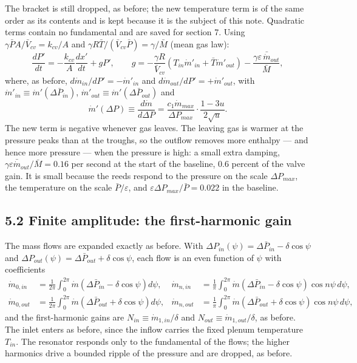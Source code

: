 \documentclass[11pt]{article}
\begin{document}
The bracket is still dropped, as before; the new temperature term is of the same order as its contents and is kept because it is the subject of this note. Quadratic terms contain no fundamental and are saved for section 7. Using $\gamma\bar PA/\bar V_{cv} = k_{cv}/A$ and $\gamma R\bar T/(\bar V_{cv}\bar P) = \gamma/\bar M$ (mean gas law):
\begin{equation}
\frac{dP'}{dt} = -\frac{k_{cv}}{A}\frac{dx'}{dt} + gP', \qquad
g = -\frac{\gamma R}{\bar V_{cv}}\left(T_{in}\dot m'_{in} + \bar T\dot m'_{out}\right) - \frac{\gamma\varepsilon\,\bar{\dot m}_{out}}{\bar M} , \tag{14$'$}
\end{equation}
where, as before, $d\dot m_{in}/dP' = -\dot m'_{in}$ and $d\dot m_{out}/dP' = +\dot m'_{out}$, with $\dot m'_{in} \equiv \dot m'(\Delta\bar P_{in})$, $\dot m'_{out} \equiv \dot m'(\Delta\bar P_{out})$ and
\begin{equation}
\dot m'(\Delta P) \equiv \frac{d\dot m}{d\Delta P} = \frac{c_1\dot m_{max}}{\Delta P_{max}}\cdot\frac{1-3u}{2\sqrt u} . \tag{15}
\end{equation}
The new term is negative whenever gas leaves. The leaving gas is warmer at the pressure peaks than at the troughs, so the outflow removes more enthalpy --- and hence more pressure --- when the pressure is high: a small extra damping, $\gamma\varepsilon\bar{\dot m}_{out}/\bar M = 0.16$ per second at the start of the baseline, 0.6 percent of the valve gain. It is small because the reeds respond to the pressure on the scale $\Delta P_{max}$, the temperature on the scale $\bar P/\varepsilon$, and $\varepsilon\Delta P_{max}/\bar P = 0.022$ in the baseline.

\subsection*{5.2 Finite amplitude: the first-harmonic gain}

The mass flows are expanded exactly as before. With $\Delta P_{in}(\psi) = \Delta\bar P_{in} - \delta\cos\psi$ and $\Delta P_{out}(\psi) = \Delta\bar P_{out} + \delta\cos\psi$, each flow is an even function of $\psi$ with coefficients
\begin{equation}
\begin{aligned}
\dot m_{0,in} &= \frac{1}{2\pi}\int_0^{2\pi}\dot m\left(\Delta\bar P_{in} - \delta\cos\psi\right)d\psi, &
\dot m_{n,in} &= \frac{1}{\pi}\int_0^{2\pi}\dot m\left(\Delta\bar P_{in} - \delta\cos\psi\right)\cos n\psi\,d\psi, \\
\dot m_{0,out} &= \frac{1}{2\pi}\int_0^{2\pi}\dot m\left(\Delta\bar P_{out} + \delta\cos\psi\right)d\psi, &
\dot m_{n,out} &= \frac{1}{\pi}\int_0^{2\pi}\dot m\left(\Delta\bar P_{out} + \delta\cos\psi\right)\cos n\psi\,d\psi ,
\end{aligned} \tag{16}
\end{equation}
and the first-harmonic gains are $N_{in} \equiv \dot m_{1,in}/\delta$ and $N_{out} \equiv \dot m_{1,out}/\delta$, as before. The inlet enters as before, since the inflow carries the fixed plenum temperature $T_{in}$. The resonator responds only to the fundamental of the flows; the higher harmonics drive a bounded ripple of the pressure and are dropped, as before.
\end{document}
